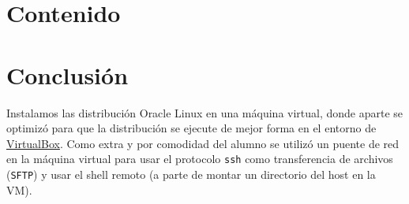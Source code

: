 \documentclass{IEEEtran}
\begin{document}
\section{Contenido}\label{sec:contenido}


\clearpage{}

\section{Conclusión}\label{sec:conclusion}
Instalamos las distribución Oracle Linux en una máquina virtual, donde aparte se optimizó
para que la distribución se ejecute de mejor forma en el entorno de
\href{https://www.virtualbox.org/}{VirtualBox}. Como extra y por comodidad del alumno se
utilizó un puente de red en la máquina virtual para usar el protocolo \texttt{ssh} como transferencia
de archivos (\texttt{SFTP}) y usar el shell remoto (a parte de montar un directorio del host en la VM).


\newpage{}

\listoffigures{}

\printbibliography{}
\end{document}
